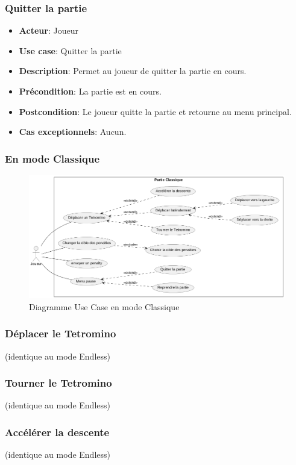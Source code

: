 \documentclass{article}
\begin{document}
\subsubsection*{Quitter la partie}
\begin{itemize}
    \item \textbf{Acteur}: Joueur
    \item \textbf{Use case}: Quitter la partie
    \item \textbf{Description}: Permet au joueur de quitter la partie en cours.
    \item \textbf{Précondition}: La partie est en cours.
    \item \textbf{Postcondition}: Le joueur quitte la partie et retourne au menu principal.
    \item \textbf{Cas exceptionnels}: Aucun.
\end{itemize}

\subsubsection{En mode Classique}

\begin{figure}[!h]
    \centering
    \includegraphics[width=1\textwidth]{uml/usescase/en-jeu/classic.png}
    \caption{Diagramme Use Case en mode Classique}
    \label{fig:Endless}
\end{figure}

\subsubsection*{Déplacer le Tetromino} (identique au mode Endless)
\subsubsection*{Tourner le Tetromino} (identique au mode Endless)
\subsubsection*{Accélérer la descente} (identique au mode Endless)
\end{document}
